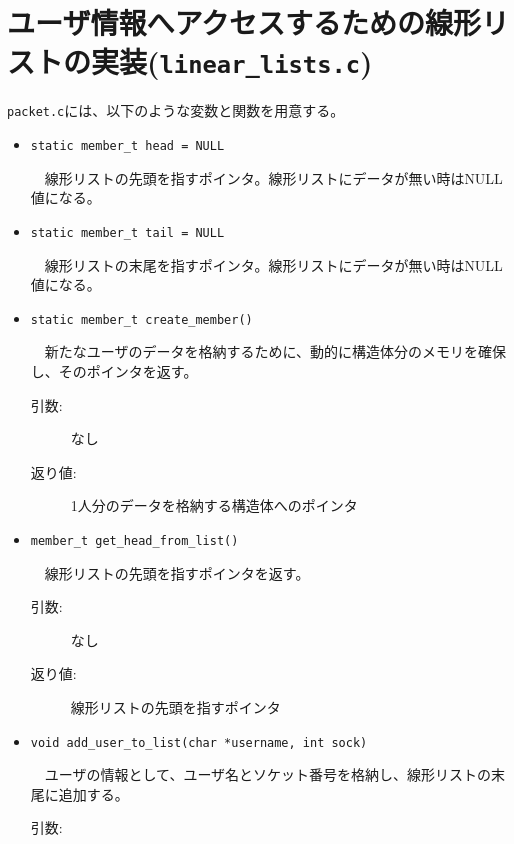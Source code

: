 \documentclass[uplatex,dvipdfmx,11pt,a4paper]{jsarticle} %
\begin{document}
\section{ユーザ情報へアクセスするための線形リストの実装({\tt linear\_lists.c})}
{\tt packet.c}には、以下のような変数と関数を用意する。
    
\begin{itemize}
    \item {\tt static member\_t head = NULL}

        　線形リストの先頭を指すポインタ。線形リストにデータが無い時はNULL値になる。
        \newline
    \item {\tt static member\_t tail = NULL}

        　線形リストの末尾を指すポインタ。線形リストにデータが無い時はNULL値になる。
        \newline
    \item {\tt static member\_t create\_member()}

        　新たなユーザのデータを格納するために、動的に構造体分のメモリを確保し、そのポインタを返す。
        \begin{description}
            \item[引数:] なし
            \item[返り値:] 1人分のデータを格納する構造体へのポインタ
            \newline
        \end{description}

    \item {\tt member\_t get\_head\_from\_list()}

        　線形リストの先頭を指すポインタを返す。
        \begin{description}
            \item[引数:] なし
            \item[返り値:] 線形リストの先頭を指すポインタ
            \newline
        \end{description}

    \item {\tt void add\_user\_to\_list(char *username, int sock)}

        　ユーザの情報として、ユーザ名とソケット番号を格納し、線形リストの末尾に追加する。
        \begin{description}
            \item[引数:] \ 


\end{description}
\end{itemize}
\end{document}
